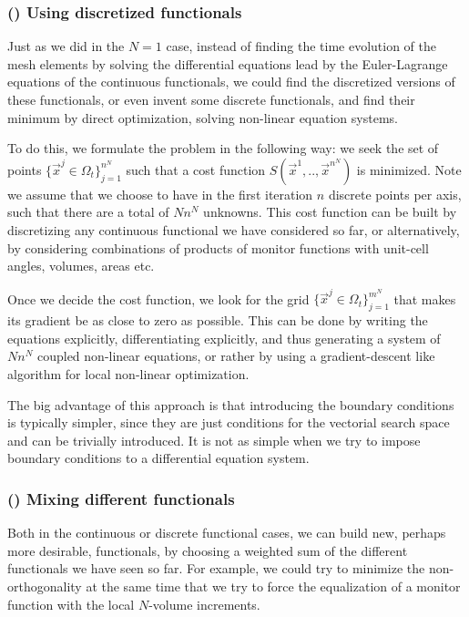 \documentclass[11pt, a4paper]{article} %
\begin{document}
\subsubsection*{\bf (\textdelta) Using discretized functionals}

Just as we did in the $N=1$ case, instead of finding the time evolution of the mesh elements by solving the differential equations lead by the Euler-Lagrange equations of the continuous functionals, we could find the discretized versions of these functionals, or even invent some discrete functionals, and find their minimum by direct optimization, solving non-linear equation systems.

To do this, we formulate the problem in the following way: we seek the set of points $\{\vec{x}^j\in \Omega_t\}_{j=1}^{n^N}$ such that a cost function $S(\vec{x}^1,..,\vec{x}^{n^N})$ is minimized. Note we assume that we choose to have in the first iteration $n$ discrete points per axis, such that there are a total of $Nn^N$ unknowns. This cost function can be built by discretizing any continuous functional we have considered so far, or alternatively, by considering combinations of products of monitor functions with unit-cell angles, volumes, areas etc. 

Once we decide the cost function, we look for the grid $\{\vec{x}^j\in \Omega_t\}_{j=1}^{m^N}$ that makes its gradient be as close to zero as possible. This can be done by writing the equations explicitly, differentiating explicitly, and thus generating a system of $Nn^N$ coupled non-linear equations, or rather by using a gradient-descent like algorithm for local non-linear optimization.

The big advantage of this approach is that introducing the boundary conditions is typically simpler, since they are just conditions for the vectorial search space and can be trivially introduced. It is not as simple when we try to impose boundary conditions to a differential equation system.

\subsubsection*{\bf (\textepsilon) Mixing different functionals}
Both in the continuous or discrete functional cases, we can build new, perhaps more desirable, functionals, by choosing a weighted sum of the different functionals we have seen so far. For example, we could try to minimize the non-orthogonality at the same time that we try to force the equalization of a monitor function with the local $N$-volume increments.
\end{document}
